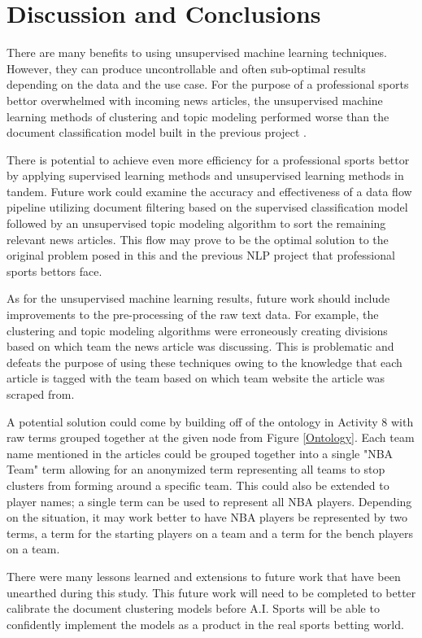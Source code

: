 \documentclass[5p,authoryear]{elsarticle}
\begin{document}
\section{Discussion and Conclusions}

There are many benefits to using unsupervised machine learning techniques.
However, they can produce uncontrollable and often sub-optimal results depending on the data and the use case. 
For the purpose of a professional sports bettor overwhelmed with incoming news articles, the unsupervised machine learning methods of clustering and topic modeling performed worse than the document classification model built in the previous project \citep{project2}.

There is potential to achieve even more efficiency for a professional sports bettor by applying supervised learning methods and unsupervised learning methods in tandem. 
Future work could examine the accuracy and effectiveness of a data flow pipeline utilizing document filtering based on the supervised classification model followed by an unsupervised topic modeling algorithm to sort the remaining relevant news articles.
This flow may prove to be the optimal solution to the original problem posed in this and the previous NLP project that professional sports bettors face.

As for the unsupervised machine learning results, future work should include improvements to the pre-processing of the raw text data. 
For example, the clustering and topic modeling algorithms were erroneously creating divisions based on which team the news article was discussing. 
This is problematic and defeats the purpose of using these techniques owing to the knowledge that each article is tagged with the team based on which team website the article was scraped from. 

A potential solution could come by building off of the ontology in Activity 8 with raw terms grouped together at the given node from Figure \ref{Ontology}. 
Each team name mentioned in the articles could be grouped together into a single "NBA Team" term allowing for an anonymized term representing all teams to stop clusters from forming around a specific team.
This could also be extended to player names; a single term can be used to represent all NBA players. 
Depending on the situation, it may work better to have NBA players be represented by two terms, a term for the starting players on a team and a term for the bench players on a team. 

There were many lessons learned and extensions to future work that have been unearthed during this study.
This future work will need to be completed to better calibrate the document clustering models before A.I. Sports will be able to confidently implement the models as a product in the real sports betting world. 
\end{document}
